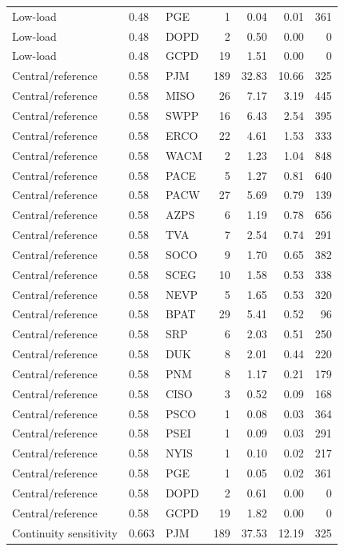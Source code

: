 \documentclass[12pt]{article}
\begin{document}
\begin{landscape}
\begin{longtable}{ll l r r r r}
Low-load & 0.48 & PGE & 1 & 0.04 & 0.01 & 361 \\
Low-load & 0.48 & DOPD & 2 & 0.50 & 0.00 & 0 \\
Low-load & 0.48 & GCPD & 19 & 1.51 & 0.00 & 0 \\
Central/reference & 0.58 & PJM & 189 & 32.83 & 10.66 & 325 \\
Central/reference & 0.58 & MISO & 26 & 7.17 & 3.19 & 445 \\
Central/reference & 0.58 & SWPP & 16 & 6.43 & 2.54 & 395 \\
Central/reference & 0.58 & ERCO & 22 & 4.61 & 1.53 & 333 \\
Central/reference & 0.58 & WACM & 2 & 1.23 & 1.04 & 848 \\
Central/reference & 0.58 & PACE & 5 & 1.27 & 0.81 & 640 \\
Central/reference & 0.58 & PACW & 27 & 5.69 & 0.79 & 139 \\
Central/reference & 0.58 & AZPS & 6 & 1.19 & 0.78 & 656 \\
Central/reference & 0.58 & TVA & 7 & 2.54 & 0.74 & 291 \\
Central/reference & 0.58 & SOCO & 9 & 1.70 & 0.65 & 382 \\
Central/reference & 0.58 & SCEG & 10 & 1.58 & 0.53 & 338 \\
Central/reference & 0.58 & NEVP & 5 & 1.65 & 0.53 & 320 \\
Central/reference & 0.58 & BPAT & 29 & 5.41 & 0.52 & 96 \\
Central/reference & 0.58 & SRP & 6 & 2.03 & 0.51 & 250 \\
Central/reference & 0.58 & DUK & 8 & 2.01 & 0.44 & 220 \\
Central/reference & 0.58 & PNM & 8 & 1.17 & 0.21 & 179 \\
Central/reference & 0.58 & CISO & 3 & 0.52 & 0.09 & 168 \\
Central/reference & 0.58 & PSCO & 1 & 0.08 & 0.03 & 364 \\
Central/reference & 0.58 & PSEI & 1 & 0.09 & 0.03 & 291 \\
Central/reference & 0.58 & NYIS & 1 & 0.10 & 0.02 & 217 \\
Central/reference & 0.58 & PGE & 1 & 0.05 & 0.02 & 361 \\
Central/reference & 0.58 & DOPD & 2 & 0.61 & 0.00 & 0 \\
Central/reference & 0.58 & GCPD & 19 & 1.82 & 0.00 & 0 \\
Continuity sensitivity & 0.663 & PJM & 189 & 37.53 & 12.19 & 325 \\

\end{longtable}
\end{landscape}
\end{document}
